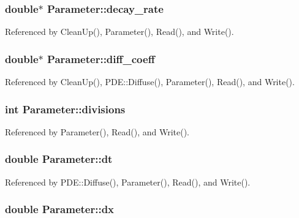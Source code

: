 \subsubsection[{decay\-\_\-rate}]{\setlength{\rightskip}{0pt plus 5cm}double$\ast$ Parameter\-::decay\-\_\-rate}\label{classParameter_a2db8148cff89a8da75fd22e3fb4666f2}


Referenced by Clean\-Up(), Parameter(), Read(), and Write().

\subsubsection[{diff\-\_\-coeff}]{\setlength{\rightskip}{0pt plus 5cm}double$\ast$ Parameter\-::diff\-\_\-coeff}\label{classParameter_a765fb5cedaec624a564ae1c1b9586037}


Referenced by Clean\-Up(), P\-D\-E\-::\-Diffuse(), Parameter(), Read(), and Write().

\subsubsection[{divisions}]{\setlength{\rightskip}{0pt plus 5cm}int Parameter\-::divisions}\label{classParameter_ae56b79b9a0846a46b52da1cb744fc266}


Referenced by Parameter(), Read(), and Write().

\subsubsection[{dt}]{\setlength{\rightskip}{0pt plus 5cm}double Parameter\-::dt}\label{classParameter_a449433a72de2c33f6365b7a001bac882}


Referenced by P\-D\-E\-::\-Diffuse(), Parameter(), Read(), and Write().

\subsubsection[{dx}]{\setlength{\rightskip}{0pt plus 5cm}double Parameter\-::dx}\label{classParameter_aea78163d89aecf54460b2b63b57d76ad}


